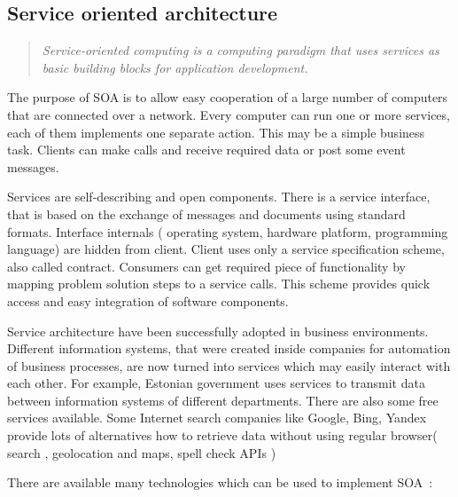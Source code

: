 \subsection{Service oriented architecture}
\begin{quote}
\textit{
Service-oriented computing is a computing paradigm that uses services as basic building blocks for
application development.}
~\cite {lws_milanovic.pdf}
\end{quote} 

The purpose of \gls{SOA} is to allow easy cooperation of a large number of
computers that are connected over a network.
Every computer can run one or more services, each of them implements one
separate action. This may be a simple business task. Clients can make calls
and receive required data or post some event messages.

Services are self-describing and open components. There is a service interface,
that is based on the exchange of messages and documents using standard formats.
Interface internals ( operating system, hardware platform, programming language)
are hidden from client. Client uses only a service specification scheme, also
called contract. Consumers can get required piece of functionality by mapping problem
solution steps to a service calls. This scheme provides quick access and easy integration of software components.


Service architecture have been successfully adopted in
business environments. Different information systems, that were created inside
companies for automation of business processes,  are now turned into services
which may easily interact with each other. For example, Estonian government uses
services to transmit data between information systems of different departments.
There are also some free services available. Some Internet search companies like
Google, Bing, Yandex provide lots of alternatives how to retrieve data without
using regular browser( search , geolocation and maps,  spell check \gls{API}s )

There are available many technologies which can be used to implement
\gls{SOA}~\cite{wikipedia:SOA}:

